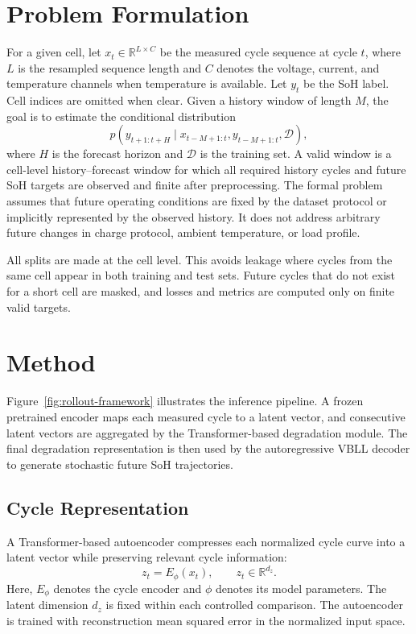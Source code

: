 \documentclass[conference]{IEEEtran}
\begin{document}
\section{Problem Formulation}

For a given cell, let $x_t \in \mathbb{R}^{L \times C}$ be the measured cycle
sequence at cycle $t$, where $L$ is the resampled sequence length and $C$
denotes the voltage, current, and temperature channels when temperature is
available. Let $y_t$ be the SoH label. Cell indices are omitted when clear.
Given a history window of length $M$, the goal is to estimate the conditional
distribution
\begin{equation}
p\left(y_{t+1:t+H} \mid x_{t-M+1:t}, y_{t-M+1:t}, \mathcal{D}\right),
\end{equation}
where $H$ is the forecast horizon and $\mathcal{D}$ is the training set. A valid window is a
cell-level history--forecast window for which all required history cycles and
future SoH targets are observed and finite after preprocessing. The formal problem
assumes that future operating conditions are fixed by the dataset protocol or
implicitly represented by the observed history. It does not address arbitrary
future changes in charge protocol, ambient temperature, or load profile.

All splits are made at the cell level. This avoids leakage where cycles from
the same cell appear in both training and test sets. Future cycles that do not
exist for a short cell are masked, and losses and metrics are computed only on
finite valid targets.

\section{Method}

Figure~\ref{fig:rollout-framework} illustrates the inference pipeline. A
frozen pretrained encoder maps each measured cycle to a latent vector, and
consecutive latent vectors are aggregated by the Transformer-based degradation
module. The final degradation representation is then used by the
autoregressive VBLL decoder to generate stochastic future SoH trajectories.

\subsection{Cycle Representation}

A Transformer-based autoencoder compresses each normalized cycle curve into
a latent vector while preserving relevant cycle information:
\begin{equation}
z_t = E_{\phi}(x_t), \qquad z_t \in \mathbb{R}^{d_z}.
\end{equation}
Here, $E_{\phi}$ denotes the cycle encoder and $\phi$ denotes its model
parameters.
The latent dimension $d_z$ is fixed within each controlled comparison. The
autoencoder is trained with reconstruction mean squared error in the normalized
input space.
\end{document}
